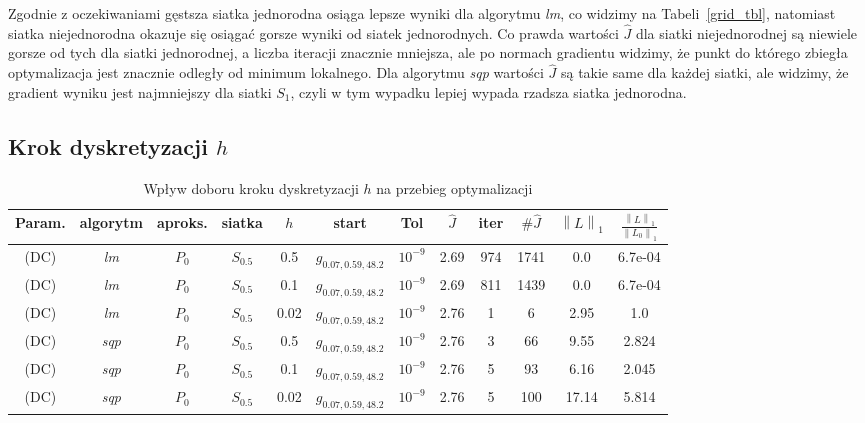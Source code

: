 \documentclass[licencjacka]{pracamgr}
\newcommand{\norm}[1]{\left\lVert#1\right\rVert}
\begin{document}
Zgodnie z oczekiwaniami gęstsza siatka jednorodna osiąga lepsze wyniki dla algorytmu {\it lm}, co widzimy na Tabeli~\ref{grid_tbl}, natomiast siatka niejednorodna okazuje się osiągać gorsze wyniki od siatek jednorodnych. Co prawda wartości $\hat{J}$ dla siatki niejednorodnej są niewiele gorsze od tych dla siatki jednorodnej, a liczba iteracji znacznie mniejsza, ale po normach gradientu widzimy, że punkt do którego zbiegła optymalizacja jest znacznie odległy od minimum lokalnego. Dla algorytmu {\it sqp\/} wartości $\hat{J}$ są takie same dla każdej siatki, ale widzimy, że gradient wyniku jest najmniejszy dla siatki $S_1$, czyli w tym wypadku lepiej wypada rzadsza siatka jednorodna.

\subsection{Krok dyskretyzacji $h$}

\begin{table}[h]
  \begin{center}
    \begin{tabular}{|c|c|c|c|c|c|c||c|c|c|c|c|}
      \hline
      Param. & algorytm & aproks. & siatka & $h$ & start & Tol & $\hat{J}$ & iter & $\#\hat{J}$ & $\norm{L}_1$ & $\frac{\norm{L}_1}{\norm{L_0}_1}$ \\
      \hline
      (DC) & {\it lm\/} & $P_0$ & $S_{0.5}$ & 0.5 & $g_{0.07,0.59,48.2}$ & $10^{-9}$ & 2.69 & 974 & 1741 & 0.0 & 6.7e-04 \\
      \hline
      (DC) & {\it lm\/} & $P_0$ & $S_{0.5}$ & 0.1 & $g_{0.07,0.59,48.2}$ & $10^{-9}$ & 2.69 & 811 & 1439 & 0.0 & 6.7e-04 \\
      \hline
      (DC) & {\it lm\/} & $P_0$ & $S_{0.5}$ & 0.02 & $g_{0.07,0.59,48.2}$ & $10^{-9}$ & 2.76 & 1 & 6 & 2.95 & 1.0 \\
      \hline
      (DC) & {\it sqp\/} & $P_0$ & $S_{0.5}$ & 0.5 & $g_{0.07,0.59,48.2}$ & $10^{-9}$ & 2.76 & 3 & 66 & 9.55 & 2.824 \\
      \hline
      (DC) & {\it sqp\/} & $P_0$ & $S_{0.5}$ & 0.1 & $g_{0.07,0.59,48.2}$ & $10^{-9}$ & 2.76 & 5 & 93 & 6.16 & 2.045 \\
      \hline
      (DC) & {\it sqp\/} & $P_0$ & $S_{0.5}$ & 0.02 & $g_{0.07,0.59,48.2}$ & $10^{-9}$ & 2.76 & 5 & 100 & 17.14 & 5.814 \\
      \hline
    \end{tabular}
    \caption{Wpływ doboru kroku dyskretyzacji $h$ na przebieg optymalizacji}\label{step_tbl}
  \end{center}
\end{table}
\end{document}
